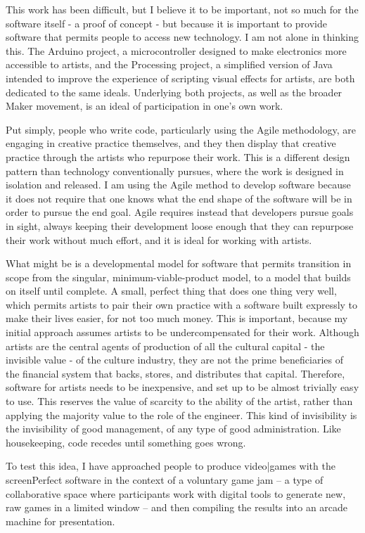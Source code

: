 This work has been difficult, but I believe it to be important, not so much for the software itself - a proof of concept - but because it is important to provide software that permits people to access new technology. I am not alone in thinking this. The Arduino project, a microcontroller designed to make electronics more accessible to artists, and the Processing project, a simplified version of Java intended to improve the experience of scripting visual effects for artists, are both dedicated to the same ideals. Underlying both projects, as well as the broader Maker movement, is an ideal of participation in one’s own work.

Put simply, people who write code, particularly using the Agile methodology, are engaging in creative practice themselves, and they then display that creative practice through the artists who repurpose their work. This is a different design pattern than technology conventionally pursues, where the work is designed in isolation and released. I am using the Agile method to develop software because it does not require that one knows what the end shape of the software will be in order to pursue the end goal. Agile requires instead that developers pursue goals in sight, always keeping their development loose enough that they can repurpose their work without much effort, and it is ideal for working with artists.

What might be is a developmental model for software that permits transition in scope from the singular, minimum-viable-product model, to a model that builds on itself until complete. A small, perfect thing that does one thing very well, which permits artists to pair their own practice with a software built expressly to make their lives easier, for not too much money. This is important, because my initial approach assumes artists to be undercompensated for their work. Although artists are the central agents of production of all the cultural capital - the invisible value - of the culture industry, they are not the prime beneficiaries of the financial system that backs, stores, and distributes that capital. Therefore, software for artists needs to be inexpensive, and set up to be almost trivially easy to use. This reserves the value of scarcity to the ability of the artist, rather than applying the majority value to the role of the engineer. This kind of invisibility is the invisibility of good management, of any type of good administration. Like housekeeping, code recedes until something goes wrong.

To test this idea, I have approached people to produce video|games with the screenPerfect software in the context of a voluntary game jam – a type of collaborative space where participants work with digital tools to generate new, raw games in a limited window – and then compiling the results into an arcade machine for presentation. 

